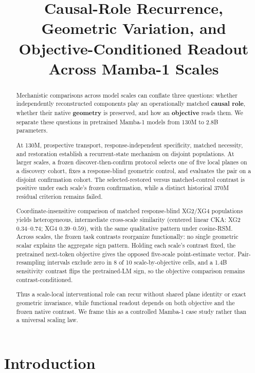 \documentclass{article}
\title{Causal-Role Recurrence, Geometric Variation, and Objective-Conditioned Readout Across Mamba-1 Scales}
\author{}
\begin{document}
\maketitle

\begin{abstract}

Mechanistic comparisons across model scales can conflate three questions: whether independently reconstructed components play an operationally matched \textbf{causal role}, whether their native \textbf{geometry} is preserved, and how an \textbf{objective} reads them. We separate these questions in pretrained Mamba-1 models from 130M to 2.8B parameters.

At 130M, prospective transport, response-independent specificity, matched necessity, and restoration establish a recurrent-state mechanism on disjoint populations. At larger scales, a frozen discover-then-confirm protocol selects one of five local planes on a discovery cohort, fixes a response-blind geometric control, and evaluates the pair on a disjoint confirmation cohort. The selected-restored versus matched-control contrast is positive under each scale's frozen confirmation, while a distinct historical 370M residual criterion remains failed.

Coordinate-insensitive comparison of matched response-blind XG2/XG4 populations yields heterogeneous, intermediate cross-scale similarity (centered linear CKA: XG2 $0.34$--$0.74$; XG4 $0.39$--$0.59$), with the same qualitative pattern under cosine-RSM. Across scales, the frozen task contrasts reorganize functionally: no single geometric scalar explains the aggregate sign pattern. Holding each scale's contrast fixed, the pretrained next-token objective gives the opposed five-scale point-estimate vector. Pair-resampling intervals exclude zero in 8 of 10 scale-by-objective cells, and a 1.4B sensitivity contrast flips the pretrained-LM sign, so the objective comparison remains contrast-conditioned.

Thus a scale-local interventional role can recur without shared plane identity or exact geometric invariance, while functional readout depends on both objective and the frozen native contrast. We frame this as a controlled Mamba-1 case study rather than a universal scaling law.

\end{abstract}
\section{Introduction}
\label{sec:intro}
\end{document}
